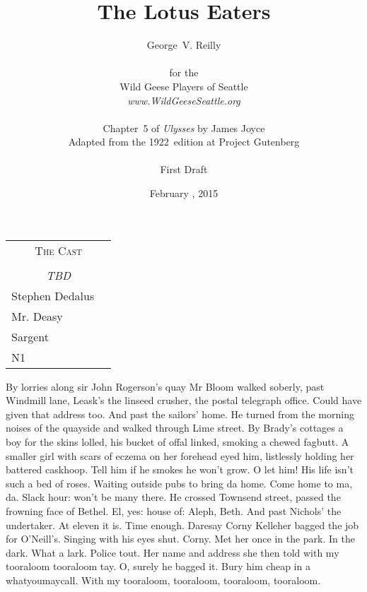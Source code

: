 



\title{\Huge The Lotus Eaters}
\author{George~V. Reilly\\
\\
{\small for the}\\
Wild Geese Players of Seattle\\
{\emph{www.WildGeeseSeattle.org}}\\
\\
{\small Chapter~5 of \emph{Ulysses} by James Joyce}\\
{\small Adapted from the 1922~edition at Project Gutenberg}
\\
\\
{\small First Draft}}
\date{February , 2015}
\raggedbottom



\maketitle
\thispagestyle{empty}
\pagebreak

\begin{tabular}{lp{10cm}}
    \multicolumn{2}{c}{\Large \textsc{The Cast}} \\
\\
    \multicolumn{2}{c}{\large \textit{TBD}} \\
Stephen Dedalus \\
Mr. Deasy \\
Sargent \\
N1 \\
\end{tabular}

\thispagestyle{empty}
\newpage


\setcounter{page}{1}

By lorries along sir John Rogerson's quay
Mr Bloom walked soberly,
past Windmill lane,
Leask's the linseed crusher,
the postal telegraph office.
Could have given that address too.
And past the sailors' home.
He turned from the morning noises of the quayside
and walked through Lime street.
By Brady's cottages
a boy for the skins lolled,
his bucket of offal linked,
smoking a chewed fagbutt.
A smaller girl with scars of eczema on her forehead
eyed him,
listlessly holding her battered caskhoop.
Tell him if he smokes he won't grow.
O let him!
His life isn't such a bed of roses.
Waiting outside pubs to bring da home.
Come home to ma, da.
Slack hour: won't be many there.
He crossed Townsend street,
passed the frowning face of Bethel.
El, yes:
house of: Aleph, Beth.
And past Nichols' the undertaker.
At eleven it is.
Time enough.
Daresay Corny Kelleher bagged the job for O'Neill's.
Singing with his eyes shut.
Corny.
Met her once in the park.
In the dark.
What a lark.
Police tout.
Her name and address she then told
with my tooraloom tooraloom tay.
O, surely he bagged it.
Bury him cheap in a whatyoumaycall.
With my tooraloom, tooraloom, tooraloom, tooraloom.

